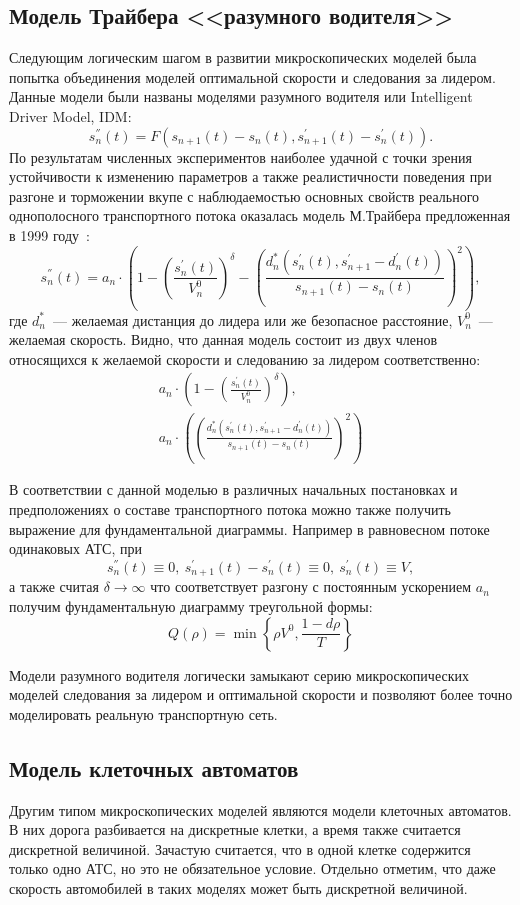 \subsection{Модель Трайбера <<разумного водителя>>}\label{subsec:ch1/sec2/sub3}
Следующим логическим шагом в развитии микроскопических моделей была попытка объединения моделей оптимальной скорости и следования за лидером.
Данные модели были названы моделями разумного водителя или Intelligent Driver Model, IDM:
\[
    s_n^{''}(t) = F(s_{n+1}(t) - s_n(t), s_{n+1}^{'}(t) - s_n^{'}(t)).
\]
По результатам численных экспериментов наиболее удачной с точки зрения устойчивости к изменению параметров а также реалистичности поведения при разгоне и торможении вкупе с наблюдаемостью основных свойств реального однополосного транспортного потока оказалась модель М.Трайбера предложенная в 1999 году~\cite{treiber1999explanation}:
\[
    s_n^{''}(t) = a_n\cdot \left( 1 - \left( \frac{s_n^{'}(t)}{V_n^0} \right)^{\delta} - \left(\frac{d_n^*(s_n^{'}(t), s_{n+1}^{'} - d_n^{'}(t))}{s_{n+1}(t) - s_n(t)}\right)^2 \right),
\]
где \(d_n^*\)~--- желаемая дистанция до лидера или же безопасное расстояние, \(V_n^0\)~--- желаемая скорость.
Видно, что данная модель состоит из двух членов относящихся к желаемой скорости и следованию за лидером соответственно:
\begin{align}
    a_n\cdot \left( 1 - \left( \frac{s_n^{'}(t)}{V_n^0} \right)^{\delta}\right), \nonumber \\
    a_n\cdot \left( \left(\frac{d_n^*(s_n^{'}(t), s_{n+1}^{'} - d_n^{'}(t))}{s_{n+1}(t) - s_n(t)}\right)^2 \right) \nonumber
\end{align}

В соответствии с данной моделью в различных начальных постановках и предположениях о составе транспортного потока можно также получить выражение для фундаментальной диаграммы.
Например в равновесном потоке одинаковых АТС, при
\[
    s_n^{''}(t) \equiv 0,\ s_{n+1}^{'}(t) - s_n^{'}(t) \equiv 0,\ s_n^{'}(t)\equiv V,
\]
а также считая \(\delta\rightarrow \infty\) что соответствует разгону с постоянным ускорением \(a_n\) получим фундаментальную диаграмму треугольной формы:
\[
    Q(\rho) = \min\left\{\rho V^0, \frac{1-d\rho}{T} \right\}
\]

Модели разумного водителя логически замыкают серию микроскопических моделей следования за лидером и оптимальной скорости и позволяют более точно моделировать реальную транспортную сеть.


\subsection{Модель клеточных автоматов}\label{subsec:ch1/sec2/sub4}
Другим типом микроскопических моделей являются модели клеточных автоматов.
В них дорога разбивается на дискретные клетки, а время также считается дискретной величиной.
Зачастую считается, что в одной клетке содержится только одно АТС, но это не обязательное условие.
Отдельно отметим, что даже скорость автомобилей в таких моделях может быть дискретной величиной.

